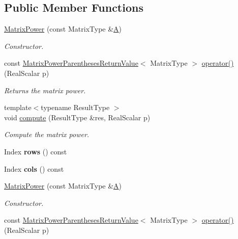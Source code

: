 \subsection*{Public Member Functions}
\begin{DoxyCompactItemize}
\item 
\hyperlink{class_eigen_1_1_matrix_power_a5eb445525601510413b53cd347c44716}{Matrix\+Power} (const Matrix\+Type \&\hyperlink{group___core___module_class_eigen_1_1_matrix}{A})
\begin{DoxyCompactList}\small\item\em Constructor. \end{DoxyCompactList}\item 
const \hyperlink{class_eigen_1_1_matrix_power_parentheses_return_value}{Matrix\+Power\+Parentheses\+Return\+Value}$<$ Matrix\+Type $>$ \hyperlink{class_eigen_1_1_matrix_power_a2ad22d156b1a7ff12d6c40a093cd95eb}{operator()} (Real\+Scalar p)
\begin{DoxyCompactList}\small\item\em Returns the matrix power. \end{DoxyCompactList}\item 
{\footnotesize template$<$typename Result\+Type $>$ }\\void \hyperlink{class_eigen_1_1_matrix_power_aa1258393dc13acd6e401e000f99b915f}{compute} (Result\+Type \&res, Real\+Scalar p)
\begin{DoxyCompactList}\small\item\em Compute the matrix power. \end{DoxyCompactList}\item 
\mbox{\label{class_eigen_1_1_matrix_power_ade4446998c2e4d83278c426944b7b72b}} 
Index {\bfseries rows} () const
\item 
\mbox{\label{class_eigen_1_1_matrix_power_a2e8d572202d337a5d651781fbcd72bbf}} 
Index {\bfseries cols} () const
\item 
\hyperlink{class_eigen_1_1_matrix_power_a5eb445525601510413b53cd347c44716}{Matrix\+Power} (const Matrix\+Type \&\hyperlink{group___core___module_class_eigen_1_1_matrix}{A})
\begin{DoxyCompactList}\small\item\em Constructor. \end{DoxyCompactList}\item 
const \hyperlink{class_eigen_1_1_matrix_power_parentheses_return_value}{Matrix\+Power\+Parentheses\+Return\+Value}$<$ Matrix\+Type $>$ \hyperlink{class_eigen_1_1_matrix_power_a2ad22d156b1a7ff12d6c40a093cd95eb}{operator()} (Real\+Scalar p)

\end{DoxyCompactItemize}
